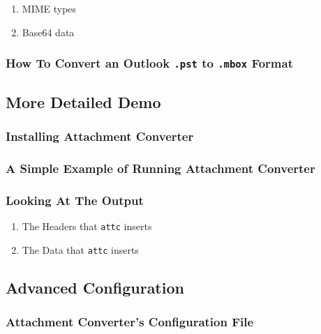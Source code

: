 \documentclass[11pt]{article}
\begin{document}
\begin{enumerate}
\item MIME types
\label{sec:orgaf67918}

\item Base64 data
\label{sec:orgc5336e9}
\end{enumerate}

\subsubsection{How To Convert an Outlook \texttt{.pst} to \texttt{.mbox} Format}
\label{sec:orgff84131}

\subsection{More Detailed Demo}
\label{sec:org880981f}

\subsubsection{Installing Attachment Converter}
\label{sec:orgd5844ef}

\subsubsection{A Simple Example of Running Attachment Converter}
\label{sec:org97cb92d}

\subsubsection{Looking At The Output}
\label{sec:org8d875dd}

\begin{enumerate}
\item The Headers that \texttt{attc} inserts
\label{sec:org17a0327}

\item The Data that \texttt{attc} inserts
\label{sec:orgf52fc4f}
\end{enumerate}

\subsection{Advanced Configuration}
\label{sec:orgac0acaa}

\subsubsection{Attachment Converter's Configuration File}
\label{sec:org51dfcfc}
\end{document}
